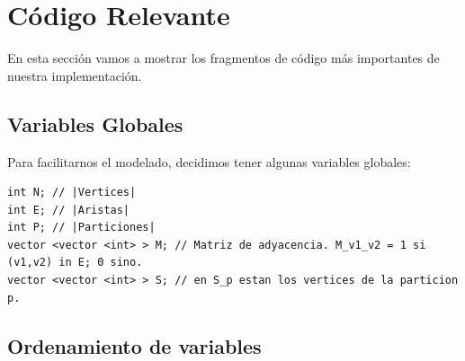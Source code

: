 \documentclass[a4paper, 10pt, twoside]{article}
\begin{document}
	











\newpage

\appendix

\section{Código Relevante}

En esta sección vamos a mostrar los fragmentos de código más importantes de nuestra implementación.

\subsection{Variables Globales}

Para facilitarnos el modelado, decidimos tener algunas variables globales:

\begin{lstlisting}
int N; // |Vertices|
int E; // |Aristas|
int P; // |Particiones|
vector <vector <int> > M; // Matriz de adyacencia. M_v1_v2 = 1 si (v1,v2) in E; 0 sino.
vector <vector <int> > S; // en S_p estan los vertices de la particion p.
\end{lstlisting}

\subsection{Ordenamiento de variables}
\end{document}
